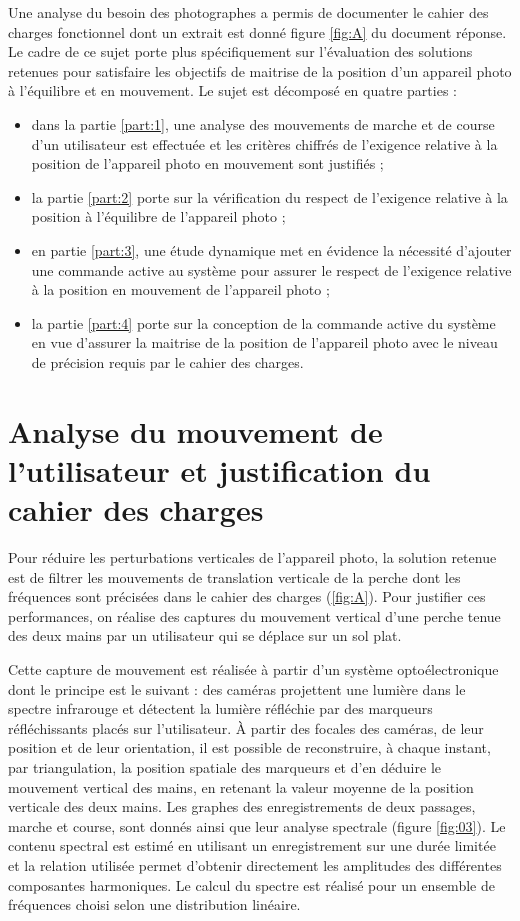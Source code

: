 Une analyse du besoin des photographes a permis de documenter le cahier des charges fonctionnel dont un extrait est donné figure \ref{fig:A} du document réponse. Le cadre de ce sujet porte plus spécifiquement sur l'évaluation des solutions retenues pour satisfaire les objectifs de maitrise de la position d'un appareil photo à l'équilibre et en mouvement. Le sujet est décomposé en quatre parties :

\begin{itemize}
  \item dans la partie \ref{part:1}, une analyse des mouvements de marche et de course d'un utilisateur est effectuée et les critères chiffrés de l'exigence relative à la position de l'appareil photo en mouvement sont justifiés ;
  \item la partie \ref{part:2} porte sur la vérification du respect de l'exigence relative à la position à l'équilibre de l'appareil photo ;
  \item en partie \ref{part:3}, une étude dynamique met en évidence la nécessité d'ajouter une commande active au système pour assurer le respect de l'exigence relative à la position en mouvement de l'appareil photo ;
  \item la partie \ref{part:4} porte sur la conception de la commande active du système en vue d'assurer la maitrise de la position de l'appareil photo avec le niveau de précision requis par le cahier des charges.

\end{itemize}

\section{\label{part:1}Analyse du mouvement de l'utilisateur et justification du cahier des charges }
Pour réduire les perturbations verticales de l'appareil photo, la solution retenue est de filtrer les mouvements de translation verticale de la perche dont les fréquences sont précisées dans le cahier des charges (\ref{fig:A}). Pour justifier ces performances, on réalise des captures du mouvement vertical d'une perche tenue des deux mains par un utilisateur qui se déplace sur un sol plat.

Cette capture de mouvement est réalisée à partir d'un système optoélectronique dont le principe est le suivant : des caméras projettent une lumière dans le spectre infrarouge et détectent la lumière réfléchie par des marqueurs réfléchissants placés sur l'utilisateur. À partir des focales des caméras, de leur position et de leur orientation, il est possible de reconstruire, à chaque instant, par triangulation, la position spatiale des marqueurs et d'en déduire le mouvement vertical des mains, en retenant la valeur moyenne de la position verticale des deux mains. Les graphes des enregistrements de deux passages, marche et course, sont donnés ainsi que leur analyse spectrale (figure \ref{fig:03}). Le contenu spectral est estimé en utilisant un enregistrement sur une durée limitée et la relation utilisée permet d'obtenir directement les amplitudes des différentes composantes harmoniques. Le calcul du spectre est réalisé pour un ensemble de fréquences choisi selon une distribution linéaire.


